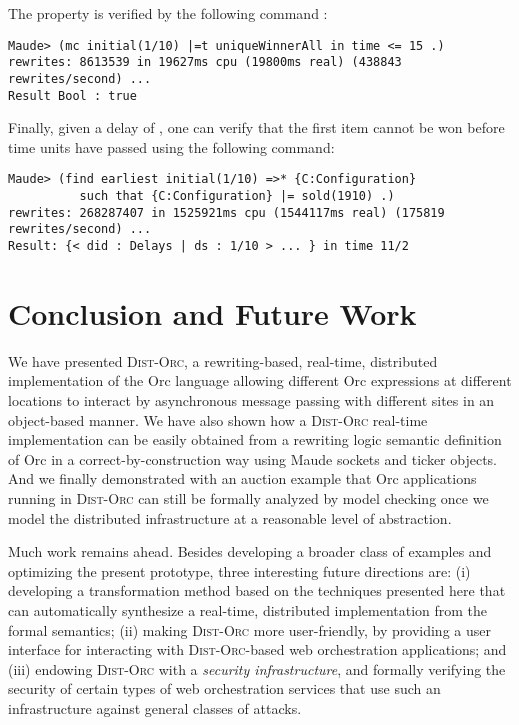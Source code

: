\documentclass{eptcs}
\begin{document}
The property is verified by the following command :


\begin{small}
\begin{verbatim}
Maude> (mc initial(1/10) |=t uniqueWinnerAll in time <= 15 .)
rewrites: 8613539 in 19627ms cpu (19800ms real) (438843 rewrites/second) ...
Result Bool : true
\end{verbatim}
\end{small}

Finally, given a delay of , one can verify that the first item cannot be won before  time units have passed using the following command: 

\begin{small}
\begin{verbatim}
Maude> (find earliest initial(1/10) =>* {C:Configuration} 
          such that {C:Configuration} |= sold(1910) .)
rewrites: 268287407 in 1525921ms cpu (1544117ms real) (175819 rewrites/second) ...
Result:	{< did : Delays | ds : 1/10 > ... } in time 11/2
\end{verbatim}
\end{small}





\section{Conclusion and Future Work} \label{sec:concl}



We have presented \textsc{Dist-Orc}, a rewriting-based, real-time, distributed implementation of the Orc language allowing different Orc expressions at different locations to interact by asynchronous message passing with different sites in an object-based manner.  We have also shown how a \textsc{Dist-Orc} real-time implementation can be easily obtained from a rewriting logic semantic definition of Orc in a correct-by-construction way using Maude sockets and ticker objects.  And we finally demonstrated with an auction example that Orc applications running in \textsc{Dist-Orc} can still be formally analyzed by model checking once we model the distributed infrastructure at a reasonable level of abstraction.

Much work remains ahead. Besides developing a broader class of examples and
optimizing the present prototype, three interesting future directions are: (i) developing a transformation method based on the techniques presented here that can automatically synthesize a real-time, distributed implementation from the formal semantics; (ii) making \textsc{Dist-Orc} more user-friendly, by providing a user interface
for interacting with \textsc{Dist-Orc}-based web orchestration applications; and (iii) endowing
\textsc{Dist-Orc} with a \emph{security infrastructure}, and formally verifying the security of certain
types of web orchestration services that use such an infrastructure against general classes of
attacks.
\end{document}
